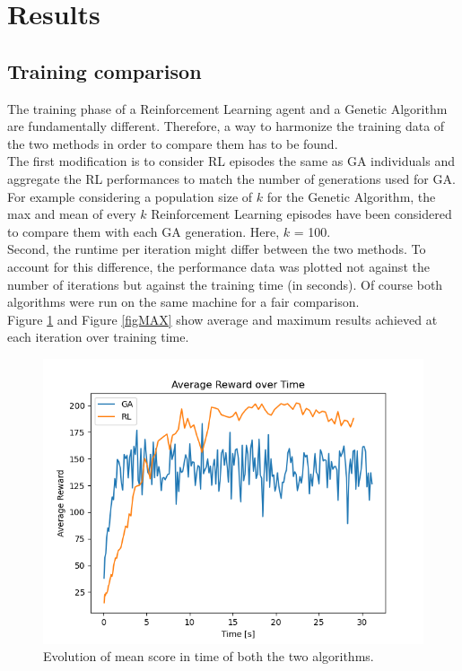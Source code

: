 \section{Results}

\subsection{Training comparison}

The training phase of a Reinforcement Learning agent and a Genetic Algorithm are fundamentally different.
Therefore, a way to harmonize the training data of the two methods in order to compare them has to be found.
\\
The first modification is to consider RL episodes the same as GA individuals and aggregate the RL performances to match the number of generations used for GA.
For example considering a population size of $k$ for the Genetic Algorithm, the max and mean of every $k$ Reinforcement Learning episodes have been considered to compare them with each GA generation. Here, $k$ = 100.
\\
Second, the runtime per iteration might differ between the two methods. To account for this difference, the performance data was plotted not against the number of iterations but against the training time (in seconds).
Of course both algorithms were run on the same machine for a fair comparison.
\\
Figure \ref{figAVG} and Figure \ref{figMAX} show average and maximum results achieved at each iteration over training time.

\begin{figure}[H]
	\centering
	\includegraphics [scale = 0.5]{Images/RL_GA_comparison_avg.png}
	\caption{Evolution of mean score in time of both the two algorithms.}
	\label{figAVG}
\end{figure}

